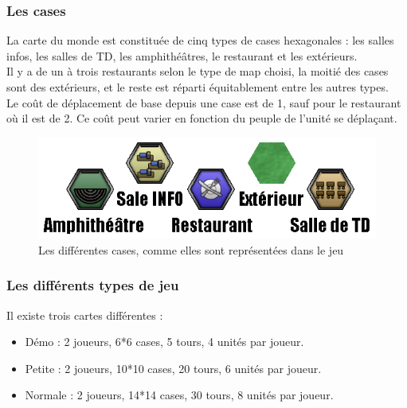 \subsubsection{Les cases}
La carte du monde est constituée de cinq types de cases hexagonales : les salles infos, les salles de TD, les amphithéâtres, le restaurant et les extérieurs.\\
Il y a de un à trois restaurants selon le type de map choisi, la moitié des cases sont des extérieurs, et le reste est réparti équitablement entre les autres types.\\
Le coût de déplacement de base depuis une case est de 1, sauf pour le restaurant où il est de 2. Ce coût peut varier en fonction du peuple de l'unité se déplaçant.

\begin{figure}[!h]
\centering
\includegraphics[width=.7\textwidth]{Parties/Images/Terrains.png}
\caption{Les différentes cases, comme elles sont représentées dans le jeu}
\label{fig:Terrains}
\end{figure}


\subsubsection{Les différents types de jeu} \label{sec:typesJeu}
Il existe trois cartes différentes :
\begin{itemize}
\item Démo : 2 joueurs, 6*6 cases, 5 tours, 4 unités par joueur.
\item Petite : 2 joueurs, 10*10 cases, 20 tours, 6 unités par joueur.
\item Normale : 2 joueurs, 14*14 cases, 30 tours, 8 unités par joueur.
\end{itemize}